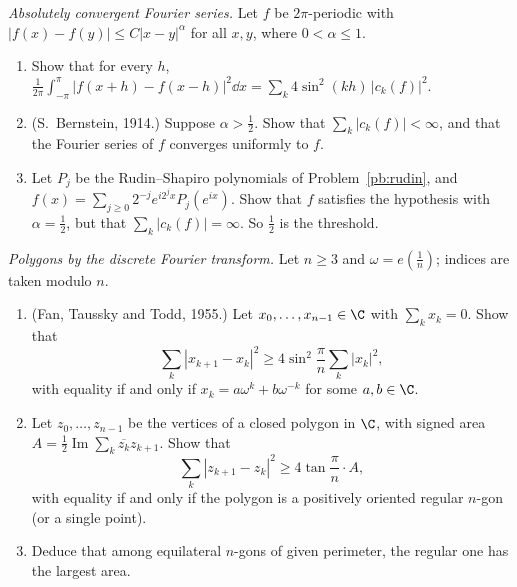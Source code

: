 \begin{exercise}[$\star\star\star$]\label{pb:bernsteinabs}
\emph{Absolutely convergent Fourier series.} Let $f$ be $2\pi$-periodic with $|f(x)-f(y)|\le C|x-y|^\alpha$ for all $x,y$, where
$0<\alpha\le1$.
\begin{enumerate}[label=(\alph*)]
\item Show that for every $h$, $\frac1{2\pi}\int_{-\pi}^\pi|f(x+h)-f(x-h)|^2\dd x=\sum_k4\sin^2(kh)\,|c_k(f)|^2$.
\item (S.~Bernstein, 1914.) Suppose $\alpha>\frac12$. Show that $\sum_k|c_k(f)|<\infty$, and that the Fourier series of $f$ converges
uniformly to $f$.
\item Let $P_j$ be the Rudin--Shapiro polynomials of Problem~\ref{pb:rudin}, and $f(x)=\sum_{j\ge0}2^{-j}e^{i2^jx}P_j(e^{ix})$. Show that $f$
satisfies the hypothesis with $\alpha=\frac12$, but that $\sum_k|c_k(f)|=\infty$. So $\frac12$ is the threshold.
\end{enumerate}
\end{exercise}

\begin{exercise}[$\star\star$]\label{pb:fantaussky}
\emph{Polygons by the discrete Fourier transform.} Let $n\ge3$ and $\omega=e(\frac1n)$; indices are taken modulo $n$.
\begin{enumerate}[label=(\alph*)]
\item (Fan, Taussky and Todd, 1955.) Let $x_0,\dots,x_{n-1}\in\C$ with $\sum_kx_k=0$. Show that
\[
\sum_k|x_{k+1}-x_k|^2\ge4\sin^2\frac\pi n\sum_k|x_k|^2,
\]
with equality if and only if $x_k=a\omega^k+b\omega^{-k}$ for some $a,b\in\C$.
\item Let $z_0,\dots,z_{n-1}$ be the vertices of a closed polygon in $\C$, with signed area $A=\frac12\operatorname{Im}\sum_k\overline{z_k}z_{k+1}$. Show that
\[
\sum_k|z_{k+1}-z_k|^2\ge4\tan\frac\pi n\cdot A,
\]
with equality if and only if the polygon is a positively oriented regular $n$-gon (or a single point).
\item Deduce that among equilateral $n$-gons of given perimeter, the regular one has the largest area.
\end{enumerate}
\end{exercise}

